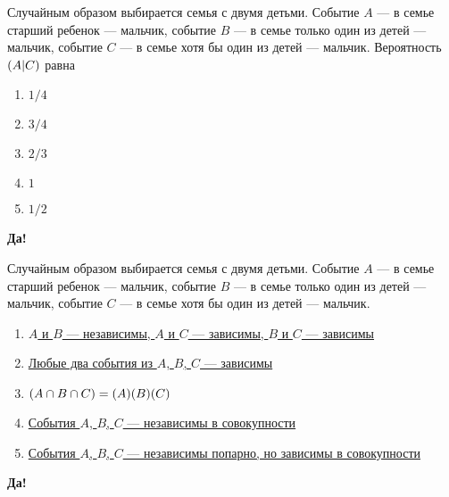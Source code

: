 \documentclass[t]{beamer}
\let\P\relax
\DeclareMathOperator{\P}{\mathbb{P}}
\begin{document}
 \begin{frame} \label{3-Yes} 
\begin{block}{3} 

Случайным образом выбирается семья с двумя детьми. Событие $A$ — в семье старший ребенок — мальчик,  событие $B$ — в семье только один из детей — мальчик, событие $C$ — в семье хотя бы один из детей — мальчик.  Вероятность $\P(A | C)$ равна
   


 \end{block} 
\begin{enumerate} 
\item[] \hyperlink{3-No}{\beamergotobutton{} $1/4$}
\item[] \hyperlink{3-No}{\beamergotobutton{} $3/4$
}
\item[] \hyperlink{3-Yes}{\beamergotobutton{} $2/3$}
\item[] \hyperlink{3-No}{\beamergotobutton{} $1$}
\item[] \hyperlink{3-No}{\beamergotobutton{} $1/2$}
\end{enumerate} 

 \textbf{Да!} 
 \hyperlink{4}{}\end{frame} 


 \begin{frame} \label{4-Yes} 
\begin{block}{4} 

Случайным образом выбирается семья с двумя детьми. Событие $A$ — в семье старший ребенок — мальчик,  событие $B$ — в семье только один из детей — мальчик, событие $C$ — в семье хотя бы один из детей — мальчик.


 \end{block} 
\begin{enumerate} 
\item[] \hyperlink{4-Yes}{\beamergotobutton{} $A$ и $B$ — независимы, $A$ и $C$ — зависимы, $B$ и $C$ — зависимы}
\item[] \hyperlink{4-No}{\beamergotobutton{} Любые два события из $A$, $B$, $C$ — зависимы}
\item[] \hyperlink{4-No}{\beamergotobutton{} $\P(A\cap B\cap C)=\P(A)\P(B)\P(C)$
}
\item[] \hyperlink{4-No}{\beamergotobutton{} События $A$, $B$, $C$ — независимы в совокупности}
\item[] \hyperlink{4-No}{\beamergotobutton{} События $A$, $B$, $C$ — независимы попарно, но зависимы в совокупности}
\end{enumerate} 

 \textbf{Да!} 
 \hyperlink{5}{}\end{frame} 
\end{document}
